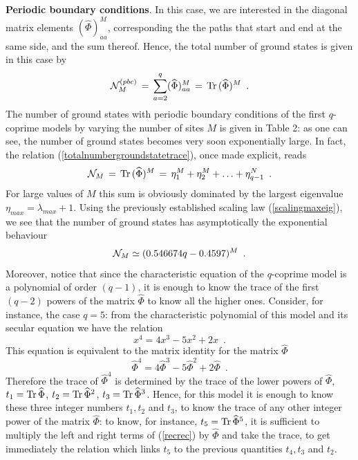 \documentclass[aps,pra,superscriptaddress]{revtex4}
\newcommand\be            {\begin{equation}}
\newcommand\ee            {\end{equation}}
\renewcommand{\(}{\left(}
\renewcommand{\)}{\right)}
\renewcommand{\[}{\left[}
\renewcommand{\]}{\right]}
\begin{document}
\vspace{3mm}
\noindent 
{\bf Periodic boundary conditions}. In this case, we are interested in the diagonal matrix elements $(\widehat \Phi)^M_{a a}$, corresponding the 
the paths that start and end at the same side, and the sum thereof. Hence, the total number of ground states is given in this case by  
\be 
{\cal N}_M^{(pbc)} \,=\,\sum_{a=2}^q (\widehat \Phi)^M_{a a} \,=\, {\rm Tr} \, (\widehat\Phi)^M \,\,\,. 
\label{totalnumbergroundstatetrace}
\ee
The number of ground states with periodic boundary conditions of the first $q$-coprime models by varying the number of sites $M$ is given in Table 2: as one can see, the number of ground states becomes very soon exponentially large. In fact, the relation (\ref{totalnumbergroundstatetrace}), once made explicit, reads 
\be 
{\cal N}_M \,=\,{\rm Tr} \, (\widehat\Phi)^M \,=\, 
\eta_1^M + \eta_2^M + \ldots + \eta_{q-1}^N \,\,\,. 
\label{sumpow}
\ee
For large values of $M$ this sum is obviously dominated by the largest eigenvalue $\eta_{max} = \lambda_{max} +1$. Using the previously 
established scaling law (\ref{scalingmaxeig}), we see that the number of ground states has asymptotically the exponential behaviour 
\be
{\cal N}_M \simeq (0.546674 q - 0.4597)^M \,\,\,. 
\label{estimateasym}
\ee
Moreover, notice that since the characteristic equation of the $q$-coprime model is a polynomial of order $(q-1)$, it is enough to know the trace of the 
first $(q-2)$ powers of the matrix $\widehat\Phi$ to know all the higher ones. Consider, for instance, the case $q=5$: from the characteristic polynomial 
of this model and its secular equation we have the relation 
\be
x^4 = 4 x^3 - 5 x^2 + 2x \,\,\,. 
\ee 
This equation is equivalent to the matrix identity for the matrix $\widehat\Phi$
\be 
\widehat \Phi^4 = 4 \widehat \Phi^3 - 5 \widehat \Phi^2 + 2 \widehat \Phi \,\,\,. 
\label{recrec}
\ee
Therefore the trace of $\widehat \Phi^4$ is determined by the trace of the lower powers of $\widehat \Phi$, 
$t_1 = {\rm Tr}\,\widehat \Phi$, $t_2 = {\rm Tr} \, \widehat \Phi^2 $, $t_3 = {\rm Tr} \, \widehat \Phi^3$.  
Hence, for this model it is enough to know these three integer numbers $t_1, t_2$ and $t_3$, to know the trace of 
any other integer power of the matrix $\widehat \Phi$: to know, for instance, $t_5 = {\rm Tr}\, \widehat \Phi^5$, it is 
sufficient to multiply the left and right terms of (\ref{recrec}) by $\widehat \Phi$ and take the trace, to get immediately 
the relation which links $t_5$ to the previous quantities $t_4, t_3$ and $t_2$. 
\end{document}
